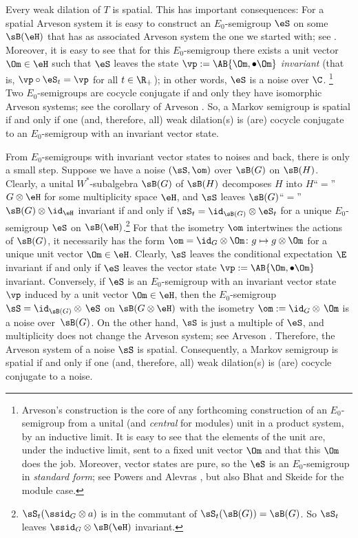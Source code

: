 Every weak dilation of $T$ is spatial. This has important consequences: For a spatial Arveson system it is easy to construct an $E_0$-semigroup $\eS$ on some $\sB(\eH)$ that has as associated Arveson system the one we started with; see \cite[Appendix]{Arv89}. Moreover, it is easy to see that for this $E_0$-semigroup there exists a unit vector $\Om\in\eH$ such that $\eS$ leaves the state $\vp:=\AB{\Om,\bullet\Om}$ \emph{invariant} (that is, $\vp\circ\eS_t=\vp$ for all $t\in\R_+$); in other words, $\eS$ is a noise over $\C$.%
\footnote{Arveson's construction is the core of any forthcoming construction of an $E_0$-semigroup from a unital (and {\it central} for modules) unit in a product system, by an inductive limit. It is easy to see that the elements of the unit are, under the inductive limit, sent to a fixed unit vector $\Om$ and that this $\Om$ does the job. Moreover, vector states are pure, so the $\eS$ is an $E_0$-semigroup in {\it standard form}; see Powers \cite{Pow99} and Alevras \cite{Ale01}, but also Bhat and Skeide \cite{BhSk00,Ske02,Ske06d} for the module case.}
Two $E_0$-semigroups are cocycle conjugate if and only they have isomorphic Arveson systems; see the corollary of Arveson \cite[Definition 3.20]{Arv89}. So, a Markov semigroup is spatial if and only if one (and, therefore, all) weak dilation(s) is (are) cocycle conjugate to an $E_0$-semigroup with an invariant vector state.

From $E_0$-semigroups with invariant vector states to noises and back, there is only a small step. Suppose we have a noise $(\sS,\om)$ over $\sB(G)$ on $\sB(H)$. Clearly, a unital $W^*$-subalgebra $\sB(G)$ of $\sB(H)$ decomposes $H$ into $H$``$=$''$G\otimes\eH$ for some multiplicity space $\eH$, and $\sS$ leaves $\sB(G)$``$=$''$\sB(G)\otimes\id_\eH$ invariant if and only if $\sS_t=\id_{\sB(G)}\otimes\eS_t$ for a unique $E_0$-semigroup $\eS$ on $\sB(\eH)$.\footnote{$\sS_t(\ssid_G\otimes a)$ is in the commutant of $\sS_t(\sB(G))=\sB(G)$. So $\sS_t$ leaves $\ssid_G\otimes\sB(\eH)$ invariant.}
For that the isometry $\om$ intertwines the actions of $\sB(G)$, it necessarily has the form $\om=\id_G\otimes\Om\colon g\mapsto g\otimes\Om$ for a unique unit vector $\Om\in\eH$. Clearly, $\sS$ leaves the conditional expectation $\E$ invariant if and only if $\eS$ leaves the vector state $\vp:=\AB{\Om,\bullet\Om}$ invariant. Conversely, if $\eS$ is an $E_0$-semigroup with an invariant vector state $\vp$ induced by a unit vector $\Om\in\eH$, then the $E_0$-semigroup $\sS=\id_{\sB(G)}\otimes\,\eS$ on $\sB(G\otimes\eH)$ with the isometry $\om:=\id_G\otimes \,\Om$ is a noise over~$\sB(G)$. On the other hand, $\sS$ is just a multiple of $\eS$, and multiplicity does not change the Arveson system; see Arveson \cite[Poposition~3.15]{Arv89}. Therefore, the Arveson system of a noise $\sS$ is spatial. Consequently, a Markov semigroup is spatial if and only if one (and, therefore, all) weak dilation(s) is (are) cocycle conjugate to a noise.

